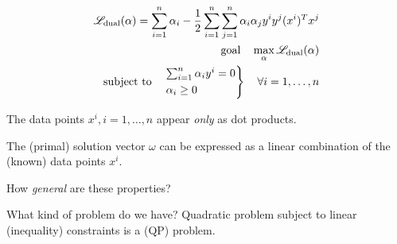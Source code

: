 
\begin{align*}
	\mathscr{L}_\text{dual}(\alpha) = \sum_{i=1}^n \alpha_i - \frac{1}{2} \sum_{i=1}^n \sum_{j=1}^n \alpha_i \alpha_j y^i y^j (x^i)^T x^j \\
	\text{goal} \quad \max_{\alpha} \mathscr{L}_\text{dual}(\alpha)                                                                       \\
	\text{subject to} \quad
	\begin{rcases*}
		\sum_{i=1}^n \alpha_i y^i = 0 \\
		\alpha_i \geq 0
	\end{rcases*} \quad \forall i=1,\dots,n
\end{align*}

\begin{note}{}{}
	The data points $x^i, i=1,\dots,n$  appear \emph{only} as
	dot products.
\end{note}

\begin{note}{}{}
	The (primal) solution vector $\omega$
	can be expressed as a linear combination of the (known) data points $x^i$.
\end{note}


\begin{question}{}{}
	How \emph{general} are these properties?
\end{question}

\begin{question}{What kind of problem do we have?}{}
	Quadratic problem subject to linear (inequality) constraints is
	a  (QP) problem.
\end{question}

